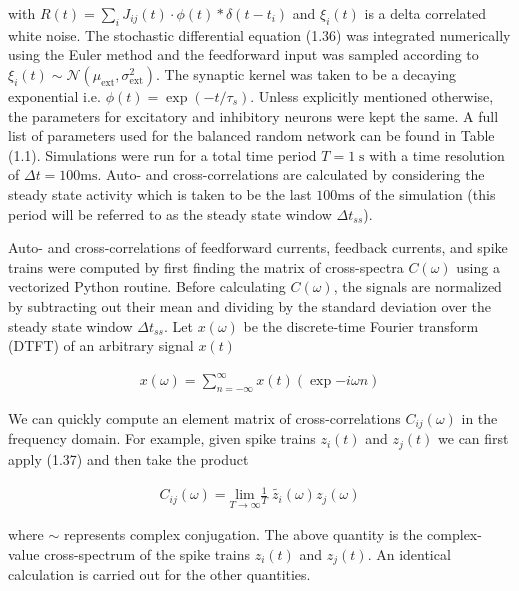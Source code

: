 \documentclass{ucetd}
\begin{document}
with $R(t) = \sum_{i} J_{ij}(t)\cdot \phi(t) * \delta(t-t_{i})$ and $\xi_{i}(t)$ is a delta correlated white noise. The stochastic differential equation (1.36) was integrated numerically using the Euler method and the feedforward input was sampled according to $\xi_{i}(t) \sim \mathcal{N}(\mu_{\mathrm{ext}},\sigma_{\mathrm{ext}}^{2})$. The synaptic kernel was taken to be a decaying exponential i.e. $\phi(t) = \exp(-t/\tau_{s})$. Unless explicitly mentioned otherwise, the parameters for excitatory and inhibitory neurons were kept the same. A full list of parameters used for the balanced random network can be found in Table (1.1). Simulations were run for a total time period $T = 1 \;\mathrm{s}$ with a time resolution of $\Delta t = 100\mathrm{ms}$. Auto- and cross-correlations are calculated by considering the steady state activity which is taken to be the last $100\mathrm{ms}$ of the simulation (this period will be referred to as the steady state window $\Delta t_{ss}$).

Auto- and cross-correlations of feedforward currents, feedback currents, and spike trains were computed by first finding the matrix of cross-spectra $C(\omega)$ using a vectorized Python routine. Before calculating $C(\omega)$, the signals are normalized by subtracting out their mean and dividing by the standard deviation over the steady state window $\Delta t_{ss}$. Let $x(\omega)$ be the discrete-time Fourier transform (DTFT) of an arbitrary signal $x(t)$

\begin{align}
x(\omega) = \sum_{n =-\infty}^{\infty}x(t)\left(\exp{-i\omega n}\right)
\end{align}

We can quickly compute an element matrix of cross-correlations $C_{ij}(\omega)$ in the frequency domain. For example, given spike trains $z_{i}(t)$ and $z_{j}(t)$ we can first apply (1.37) and then take the product

\begin{align}
C_{ij}(\omega) = \underset{T\rightarrow\infty}{\mathrm{lim}}\frac{1}{T}\;\tilde{z_{i}}(\omega)z_{j}(\omega)
\end{align}

where $\sim$ represents complex conjugation. The above quantity is the complex-value cross-spectrum of the spike trains $z_{i}(t)$ and $z_{j}(t)$. An identical calculation is carried out for the other quantities.
\end{document}
